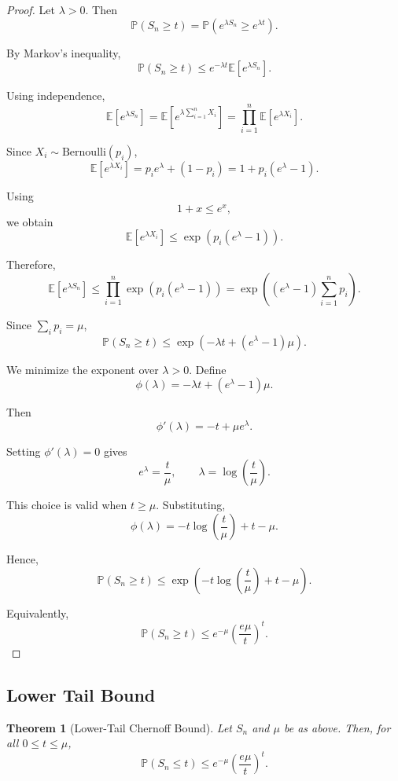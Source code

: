 \documentclass[12pt,oneside]{book}
\numberwithin{equation}{section}
\theoremstyle{definition}
\theoremstyle{plain}
\newtheorem{theorem}{Theorem}[section]
\theoremstyle{remark}
\newcommand{\E}{\mathbb{E}}
\newcommand{\Prob}{\mathbb{P}}
\newcommand{\Bern}{\mathrm{Bernoulli}}
\begin{document}
\begin{proof}
Let $\lambda>0$. Then
\[
\Prob(S_n\geq t)
=
\Prob(e^{\lambda S_n}\geq e^{\lambda t}).
\]

By Markov's inequality,
\[
\Prob(S_n\geq t)
\leq
e^{-\lambda t}\E[e^{\lambda S_n}].
\]

Using independence,
\[
\E[e^{\lambda S_n}]
=
\E\left[
e^{\lambda\sum_{i=1}^n X_i}
\right]
=
\prod_{i=1}^n
\E[e^{\lambda X_i}].
\]

Since $X_i\sim\Bern(p_i)$,
\[
\E[e^{\lambda X_i}]
=
p_i e^\lambda+(1-p_i)
=
1+p_i(e^\lambda-1).
\]

Using
\[
1+x\leq e^x,
\]
we obtain
\[
\E[e^{\lambda X_i}]
\leq
\exp\left(p_i(e^\lambda-1)\right).
\]

Therefore,
\[
\E[e^{\lambda S_n}]
\leq
\prod_{i=1}^n
\exp\left(p_i(e^\lambda-1)\right)
=
\exp\left((e^\lambda-1)\sum_{i=1}^n p_i\right).
\]

Since $\sum_i p_i=\mu$,
\[
\Prob(S_n\geq t)
\leq
\exp\left(
-\lambda t+(e^\lambda-1)\mu
\right).
\]

We minimize the exponent over $\lambda>0$. Define
\[
\phi(\lambda)
=
-\lambda t+(e^\lambda-1)\mu.
\]

Then
\[
\phi'(\lambda)
=
-t+\mu e^\lambda.
\]

Setting $\phi'(\lambda)=0$ gives
\[
e^\lambda=\frac{t}{\mu},
\qquad
\lambda=\log\left(\frac{t}{\mu}\right).
\]

This choice is valid when $t\geq\mu$. Substituting,
\[
\phi(\lambda)
=
-t\log\left(\frac{t}{\mu}\right)
+
t-\mu.
\]

Hence,
\[
\Prob(S_n\geq t)
\leq
\exp\left(
-t\log\left(\frac{t}{\mu}\right)+t-\mu
\right).
\]

Equivalently,
\[
\Prob(S_n\geq t)
\leq
e^{-\mu}
\left(
\frac{e\mu}{t}
\right)^t.
\]
\end{proof}

\subsection{Lower Tail Bound}

\begin{theorem}[Lower-Tail Chernoff Bound]
Let $S_n$ and $\mu$ be as above. Then, for all $0\leq t\leq\mu$,
\[
\Prob(S_n\leq t)
\leq
e^{-\mu}
\left(
\frac{e\mu}{t}
\right)^t.
\]
\end{theorem}
\end{document}

